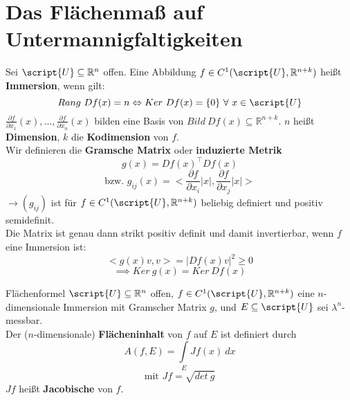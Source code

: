 \chapter{Das Flächenmaß auf Untermannigfaltigkeiten}

  \begin{definition}
    Sei $\script{U} \subseteq \mathbb{R}^n$ offen. Eine Abbildung $f \in C^1(\script{U}, \mathbb{R}^{n+k})$ heißt \textbf{Immersion}, wenn gilt:
    $$Rang \ Df(x) = n \Leftrightarrow Ker \ Df(x) = \{0\} \ \forall \ x \in \script{U}$$
    $\frac{\partial f}{\partial x_1}(x), ..., \frac{\partial f}{\partial x_n}(x)$ bilden eine Basis von $Bild \ Df(x) \subseteq \mathbb{R}^{n+k}$. $n$ heißt \textbf{Dimension}, $k$ die \textbf{Kodimension} von $f$.\\
    Wir definieren die \textbf{Gramsche Matrix} oder \textbf{induzierte Metrik}
    $$g(x) = Df(x)^{\top} Df(x)$$ 
    $$\text{bzw. } g_{ij}(x) = <\frac{\partial f}{\partial x_i}|x|, \frac{\partial f}{\partial x_j}|x|>$$
    $\rightarrow (g_{ij})$ ist für $f \in C^1(\script{U}, \mathbb{R}^{n+k})$ beliebig definiert und positiv semidefinit.\\
    Die Matrix ist genau dann strikt positiv definit und damit invertierbar, wenn $f$ eine Immersion ist:
    $$<g(x)v, v> = |Df(x)v|^2 \geq 0$$
    $$\implies Ker \ g(x) = Ker \ Df(x)$$
  \end{definition}

  \begin{definition}{Flächenformel}
    $\script{U} \subseteq \mathbb{R}^n$ offen, $f \in C^1(\script{U}, \mathbb{R}^{n+k})$ eine $n$-dimensionale Immersion mit Gramscher Matrix $g$, und $E \subseteq \script{U}$ sei $\lambda^n$-messbar.\\
    Der ($n$-dimensionale) \textbf{Flächeninhalt} von $f$ auf $E$ ist definiert durch
    $$A(f,E) = \int\limits_E Jf(x) \ dx$$
    $$\text{mit } Jf = \sqrt{det \ g}$$
    $Jf$ heißt \textbf{Jacobische} von $f$.
  \end{definition}


